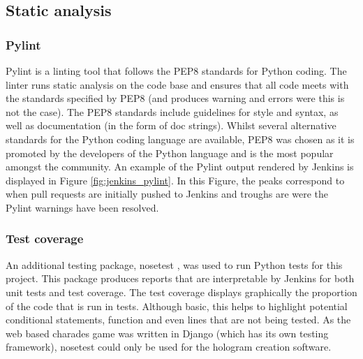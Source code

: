 \subsection{Static analysis}
\subsubsection{Pylint}
Pylint is a linting tool that follows the PEP8 standards \cite{pep8} for Python coding. The linter runs static analysis on the code base and ensures that all code meets with the standards specified by PEP8 (and produces warning and errors were this is not the case). The PEP8 standards include guidelines for style and syntax, as well as documentation (in the form of doc strings). Whilst several alternative standards for the Python coding language are available, PEP8 was chosen as it is promoted by the developers of the Python language and is the most popular amongst the community. An example of the Pylint output rendered by Jenkins is displayed in Figure \ref{fig:jenkins_pylint}. In this Figure, the peaks correspond to when pull requests are initially pushed to Jenkins and troughs are were the Pylint warnings have been resolved.
\begin{figure}[h!]
\end{figure}

\newpage

\subsubsection{Test coverage} 
An additional testing package, nosetest \cite{nosetest}, was used to run Python tests for this project. This package produces reports that are interpretable by Jenkins for both unit tests and test coverage. The test coverage displays graphically the proportion of the code that is run in tests. Although basic, this helps to highlight potential conditional statements, function and even lines that are not being tested. As the web based charades game was written in Django (which has its own testing framework), nosetest could only be used for the hologram creation software.

